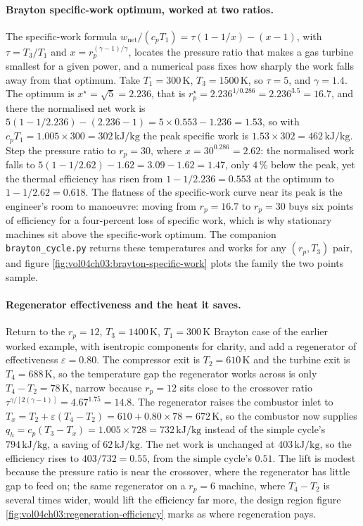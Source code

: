 \paragraph{Brayton specific-work optimum, worked at two ratios.} The
specific-work formula $w_{\text{net}}/(c_p T_1) = \tau(1 - 1/x) - (x - 1)$,
with $\tau = T_3/T_1$ and $x = r_p^{(\gamma-1)/\gamma}$, locates the pressure
ratio that makes a gas turbine smallest for a given power, and a numerical
pass fixes how sharply the work falls away from that optimum. Take $T_1 =
300\,\si{\kelvin}$, $T_3 = 1500\,\si{\kelvin}$, so $\tau = 5$, and $\gamma =
1.4$. The optimum is $x^\star = \sqrt{5} = 2.236$, that is $r_p^\star =
2.236^{1/0.286} = 2.236^{3.5} = 16.7$, and there the normalised net work is
$5(1 - 1/2.236) - (2.236 - 1) = 5 \times 0.553 - 1.236 = 1.53$, so with $c_p
T_1 = 1.005 \times 300 = 302\,\text{kJ}/\text{kg}$ the peak specific work is
$1.53 \times 302 = 462\,\text{kJ}/\text{kg}$. Step the pressure ratio to
$r_p = 30$, where $x = 30^{0.286} = 2.62$: the normalised work falls to
$5(1 - 1/2.62) - 1.62 = 3.09 - 1.62 = 1.47$, only $4\,\%$ below the peak, yet
the thermal efficiency has risen from $1 - 1/2.236 = 0.553$ at the optimum to
$1 - 1/2.62 = 0.618$. The flatness of the specific-work curve near its peak
is the engineer's room to manoeuvre: moving from $r_p = 16.7$ to $r_p = 30$
buys six points of efficiency for a four-percent loss of specific work, which
is why stationary machines sit above the specific-work optimum. The companion
\texttt{brayton\_cycle.py} returns these temperatures and works for any
$(r_p, T_3)$ pair, and figure \ref{fig:vol04ch03:brayton-specific-work} plots
the family the two points sample.

\paragraph{Regenerator effectiveness and the heat it saves.} Return to the
$r_p = 12$, $T_3 = 1400\,\si{\kelvin}$, $T_1 = 300\,\si{\kelvin}$ Brayton case
of the earlier worked example, with isentropic components for clarity, and add
a regenerator of effectiveness $\varepsilon = 0.80$. The compressor exit is
$T_2 = 610\,\si{\kelvin}$ and the turbine exit is $T_4 = 688\,\si{\kelvin}$,
so the temperature gap the regenerator works across is only $T_4 - T_2 =
78\,\si{\kelvin}$, narrow because $r_p = 12$ sits close to the crossover ratio
$\tau^{\gamma/[2(\gamma-1)]} = 4.67^{1.75} = 14.8$. The regenerator raises the
combustor inlet to $T_x = T_2 + \varepsilon(T_4 - T_2) = 610 + 0.80 \times 78
= 672\,\si{\kelvin}$, so the combustor now supplies $q_h = c_p(T_3 - T_x) =
1.005 \times 728 = 732\,\text{kJ}/\text{kg}$ instead of the simple cycle's
$794\,\text{kJ}/\text{kg}$, a saving of $62\,\text{kJ}/\text{kg}$. The net
work is unchanged at $403\,\text{kJ}/\text{kg}$, so the efficiency rises to
$403/732 = 0.55$, from the simple cycle's $0.51$. The lift is modest because
the pressure ratio is near the crossover, where the regenerator has little gap
to feed on; the same regenerator on a $r_p = 6$ machine, where $T_4 - T_2$ is
several times wider, would lift the efficiency far more, the design region
figure \ref{fig:vol04ch03:regeneration-efficiency} marks as where regeneration
pays.

